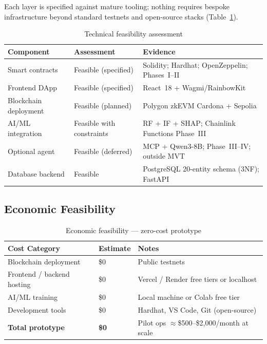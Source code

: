 \documentclass[12pt, a4paper]{report}
\newcommand{\tableheadcolor}{\rowcolor{TableHeadBg}}
\begin{document}
Each layer is specified against mature tooling; nothing requires bespoke infrastructure beyond standard testnets and open-source stacks (Table~\ref{tab:tech-feasibility}).

\begin{table}[H]
\centering
\caption[Technical feasibility assessment]{Technical feasibility assessment}
\label{tab:tech-feasibility}
\begin{tabular}{p{3cm}p{3cm}p{7.5cm}}
\toprule
\tableheadcolor
\textbf{Component} & \textbf{Assessment} & \textbf{Evidence} \\
\midrule
Smart contracts & Feasible (specified) & Solidity; Hardhat; OpenZeppelin; Phases~I--II \\
Frontend DApp & Feasible (specified) & React~18 + Wagmi/RainbowKit \\
Blockchain deployment & Feasible (planned) & Polygon zkEVM Cardona + Sepolia \\
AI/ML integration & Feasible with constraints & RF + IF + SHAP; Chainlink Functions Phase~III \\
Optional agent & Feasible (deferred) & MCP + Qwen3-8B; Phase~III--IV; outside MVT \\
Database backend & Feasible & PostgreSQL 20-entity schema (3NF); FastAPI \\
\bottomrule
\end{tabular}
\end{table}

\vspace{2pt}

\subsection{Economic Feasibility}

\begin{table}[H]
\centering
\caption[Economic feasibility --- zero-cost prototype]{Economic feasibility --- zero-cost prototype}
\label{tab:economic-feasibility}
\begin{tabular}{p{4cm}p{2.5cm}p{7cm}}
\toprule
\tableheadcolor
\textbf{Cost Category} & \textbf{Estimate} & \textbf{Notes} \\
\midrule
Blockchain deployment & \$0 & Public testnets \\
Frontend / backend hosting & \$0 & Vercel / Render free tiers or localhost \\
AI/ML training & \$0 & Local machine or Colab free tier \\
Development tools & \$0 & Hardhat, VS Code, Git (open-source) \\
\textbf{Total prototype} & \textbf{\$0} & Pilot ops $\approx$\$500--\$2{,}000/month at scale \\
\bottomrule
\end{tabular}
\end{table}
\end{document}
